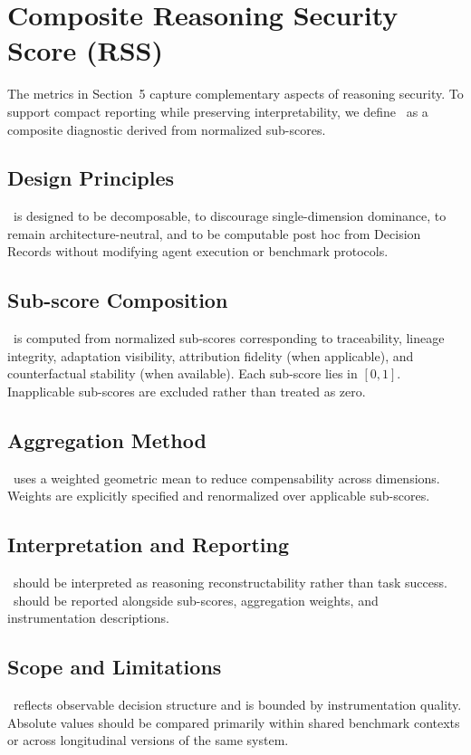 \section{Composite Reasoning Security Score (RSS)}
The metrics in Section~5 capture complementary aspects of reasoning security. To support compact reporting while preserving interpretability, we define \RSS\ as a composite diagnostic derived from normalized sub-scores.

\subsection{Design Principles}
\RSS\ is designed to be decomposable, to discourage single-dimension dominance, to remain architecture-neutral, and to be computable post hoc from Decision Records without modifying agent execution or benchmark protocols.

\subsection{Sub-score Composition}
\RSS\ is computed from normalized sub-scores corresponding to traceability, lineage integrity, adaptation visibility, attribution fidelity (when applicable), and counterfactual stability (when available). Each sub-score lies in $[0,1]$. Inapplicable sub-scores are excluded rather than treated as zero.

\subsection{Aggregation Method}
\RSS\ uses a weighted geometric mean to reduce compensability across dimensions. Weights are explicitly specified and renormalized over applicable sub-scores.

\subsection{Interpretation and Reporting}
\RSS\ should be interpreted as reasoning reconstructability rather than task success. \RSS\ should be reported alongside sub-scores, aggregation weights, and instrumentation descriptions.

\subsection{Scope and Limitations}
\RSS\ reflects observable decision structure and is bounded by instrumentation quality. Absolute values should be compared primarily within shared benchmark contexts or across longitudinal versions of the same system.
